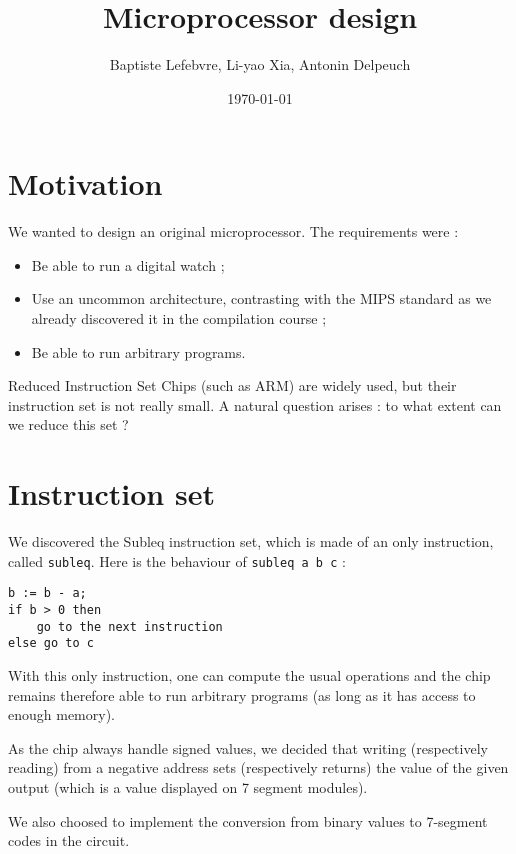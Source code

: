 \documentclass[a4paper]{article}
\begin{document}
\title{Microprocessor design}
\author{Baptiste Lefebvre, Li-yao Xia, Antonin Delpeuch}
\date{\today}

\maketitle

\section{Motivation}

We wanted to design an original microprocessor. The requirements were :
\begin{itemize}
\item Be able to run a digital watch ;
\item Use an uncommon architecture, contrasting with the MIPS standard as we
already discovered it in the compilation course ;
\item Be able to run arbitrary programs.
\end{itemize}

Reduced Instruction Set Chips (such as ARM) are widely used, but their instruction set
is not really small. A natural question arises : to what extent can we
reduce this set ? 

\section{Instruction set}

We discovered the Subleq instruction set, which is made of an only
instruction, called \texttt{subleq}. Here is the behaviour of
\texttt{subleq a b c} :

\begin{verbatim}
b := b - a;
if b > 0 then
    go to the next instruction
else go to c
\end{verbatim}

With this only instruction, one can compute the usual operations
and the chip remains therefore able to run arbitrary programs
(as long as it has access to enough memory).

As the chip always handle signed values, we decided that writing
(respectively 
reading) from a negative address sets (respectively returns) the value of
the given output (which is a value displayed on 7 segment modules).

We also choosed to implement the conversion from binary values
to 7-segment codes in the circuit. 
\end{document}

